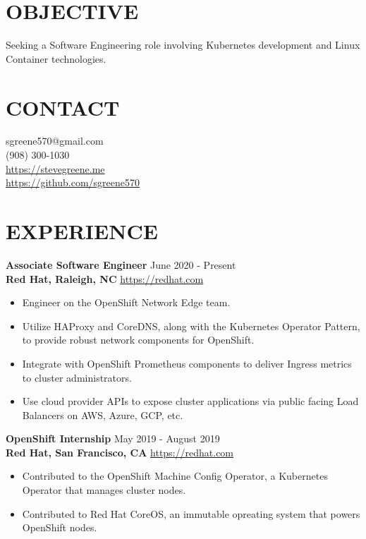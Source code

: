 \documentclass[line, margin, 11pt]{res}
\begin{document}

\begin{resume}

\section{\small OBJECTIVE}
Seeking a Software Engineering role involving Kubernetes development and Linux Container technologies.

\section{\small CONTACT}
sgreene570@gmail.com \\
(908) 300-1030 \\
\url{https://stevegreene.me} \\
\url{https://github.com/sgreene570}

\section{\small EXPERIENCE}
{\bf \large{Associate Software Engineer}} \hfill June 2020 - Present \\
{\bf Red Hat, Raleigh, NC} \hfill \url{https://redhat.com}
\begin{itemize}
    \item Engineer on the OpenShift Network Edge team.
    \item Utilize HAProxy and CoreDNS, along with the Kubernetes Operator Pattern, to provide robust network components for OpenShift.
    \item Integrate with OpenShift Prometheus components to deliver Ingress metrics to cluster administrators.
    \item Use cloud provider APIs to expose cluster applications via public facing Load Balancers on AWS, Azure, GCP, etc.
\end{itemize}


{\bf \large{OpenShift Internship}} \hfill May 2019 - August 2019 \\
{\bf Red Hat, San Francisco, CA} \hfill \url{https://redhat.com}
\begin{itemize}
    \item Contributed to the OpenShift Machine Config Operator, a Kubernetes Operator that manages cluster nodes.
    \item Contributed to Red Hat CoreOS, an immutable opreating system that powers OpenShift nodes.
\end{itemize}



\end{resume}
\end{document}
